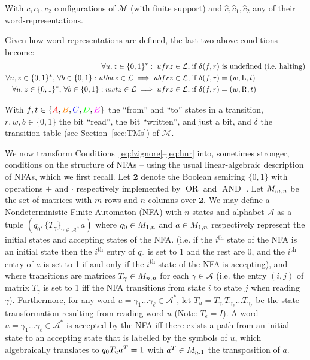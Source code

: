 With $c, c_1, c_2$ configurations of $\mathcal{M}$ (with finite support) and $\hat{c}, \hat{c}_1, \hat{c}_2$ any of their word-representations.


Given how word-representations are defined, the last two above conditions become:
\begin{align}
    \forall u,z\in\{0, 1\}^*: \; ufrz \in \mathcal{L},\;                                                           & \text{if $\delta(f,r)$ is undefined (i.e.~halting)} \label{eq:h0}
    \\
    \forall u,z\in\{0, 1\}^*,\,\forall b \in \{0, 1\}: utbwz \in \mathcal{L} \implies ubfrz \in \mathcal{L},\;     & \text{if $\delta(f,r) = (w,\text{L},t)$} \label{eq:hnl}
    \\
    \forall u,z\in\{0, 1\}^*,\,\forall b \in \{0, 1\}: u w t z \in \mathcal{L} \implies u f r z \in \mathcal{L},\; & \text{if $\delta(f,r) = (w,\text{R},t)$} \label{eq:hnr}
\end{align}

With $f,t \in \{\stateA,\stateB,\stateC,\stateD,\stateE\}$ the ``from'' and ``to'' states in a transition, $r,w,b \in \{0,1\}$ the bit ``read'', the bit ``written'', and just a bit, and $\delta$ the transition table (see Section~\ref{sec:TMs}) of $\mathcal{M}$.


We now transform Conditions~\eqref{eq:lzignore}–\eqref{eq:hnr} into, sometimes stronger, conditions on the structure of NFAs -- using the usual linear-algebraic description of NFAs, which we first recall. Let $\mathbf{2}$ denote the Boolean semiring $\{0,1\}$ with operations $+$ and $\cdot$ respectively implemented by $\operatorname{OR}$ and $\operatorname{AND}$ \cite{CUNINGHAMEGREEN1991251}. Let $M_{m,n}$ be the set of matrices with $m$ rows and $n$ columns over $\mathbf{2}$. We may define a Nondeterministic Finite Automaton (NFA) with $n$ states and alphabet $\mathcal{A}$ as a tuple $(q_0, \{T_\gamma\}_{\gamma \in \mathcal{A}}, a)$ where $q_0 \in M_{1,n}$ and $a \in M_{1,n}$ respectively represent the initial states and accepting states of the NFA. (i.e. if the $i^\text{th}$ state of the NFA is an initial state then the $i^\text{th}$ entry of $q_0$ is set to 1 and the rest are 0, and the $i^\text{th}$ entry of $a$ is set to 1 if and only if the $i^\text{th}$ state of the NFA is accepting), and where transitions are matrices $T_\gamma\in M_{n,n}$ for each $\gamma\in\mathcal{A}$ (i.e. the entry $(i,j)$ of matrix $T_\gamma$ is set to 1 iff the NFA transitions from state $i$ to state $j$ when reading $\gamma$). Furthermore, for any word $u=\gamma_1\dots\gamma_\ell \in \mathcal{A}^*$, let $T_u = T_{\gamma_1} T_{\gamma_2} \dots T_{\gamma_\ell}$ be the state transformation resulting from reading word $u$ (Note: $T_\epsilon = I$). A word $u=\gamma_1\dots\gamma_\ell \in \mathcal{A}^*$ is accepted by the NFA iff there exists a path from an initial state to an accepting state that is labelled by the symbols of $u$, which algebraically translates to $q_0 T_u a^{T} = 1$ with $a^{T} \in M_{n,1}$ the transposition of $a$.

